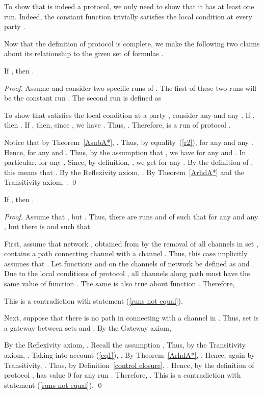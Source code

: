 \documentclass{llncs}
\newcommand{\gateway}{Gateway }
\begin{document}
To show that  is indeed a protocol, we only need to show that it has at least one run. Indeed, 
the constant function  trivially satisfies the local condition at every party .

Now that the definition of protocol  is complete, we make the following two claims about its relationship to the given set of formulas .

\begin{theorem}\label{th1}
If , then .
\end{theorem}
\begin{proof} 
Assume  and consider two specific runs of .
The first of these two runs will be the constant run . The second run is defined as

To show that  satisfies the local condition at a party , consider any  and 
any . If , then . If , then, since , we have 
. Thus, . Therefore,  is a run of protocol .

Notice that by Theorem~\ref{AsubA*}, . Thus, by equality~(\ref{r2}),  for any  and any . Hence,  for any  and . Thus, by the assumption that , we have  for any  and . In particular,  for any .
Since, by definition, , we get  for any . By the definition of , this means that
. By the Reflexivity axiom, . By Theorem~\ref{ArhdA*} and the Transitivity axiom, .
\qed 

\end{proof}

\begin{theorem}\label{th2}
If , then . 
\end{theorem}
\begin{proof}
Assume that , but . Thus, there are runs  and  of  such that  for any  and any , but there is  and 
such that 

First, assume that network , obtained from  by the removal of all channels in set , contains a path  connecting channel  with a channel . Thus, this case implicitly assumes that . Let functions  and  on the channels of network  be defined as  and . Due to the local conditions of protocol , all channels along path   must have the same value  of function . The same is also true about function . Therefore,

This is a contradiction with statement (\ref{runs not equal}).

Next, suppose that there is no path in  connecting  with a channel in . Thus, set  is a gateway between sets  and . By the \gateway axiom,

By the Reflexivity axiom, . Recall the assumption . Thus, by the Transitivity axiom, . Taking into account (\ref{eq1}), . By Theorem~\ref{ArhdA*}, . Hence, again by Transitivity, 
. Thus, by Definition~\ref{control closure}, . Hence, by the definition of protocol ,  has value 0 for any run . Therefore, . This is a contradiction with statement (\ref{runs not equal}).
\qed 
\end{proof}
\end{document}
